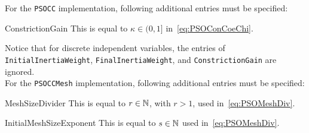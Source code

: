\vspace{2\baselineskip}
\noindent
For the \texttt{PSOCC} implementation, following additional entries must be
specified:
\begin{codedescription}
\item [ConstrictionGain]
This is equal to $\kappa \in (0, 1]$ in~\eqref{eq:PSOConCoeChi}.
\end{codedescription}
Notice that for discrete independent variables, the entries of
\texttt{InitialInertiaWeight}, \texttt{FinalInertiaWeight}, and \texttt{ConstrictionGain}
are ignored.\\

\vspace{2\baselineskip}
\noindent
For the \texttt{PSOCCMesh} implementation, following additional entries must be
specified:
\begin{codedescription}
\item [MeshSizeDivider]
This is equal to $r \in {\mathbb N}$, with $r > 1$, used in~\eqref{eq:PSOMeshDiv}.
\item [InitialMeshSizeExponent]
This is equal to $s \in {\mathbb N}$ used in~\eqref{eq:PSOMeshDiv}.
\end{codedescription}

